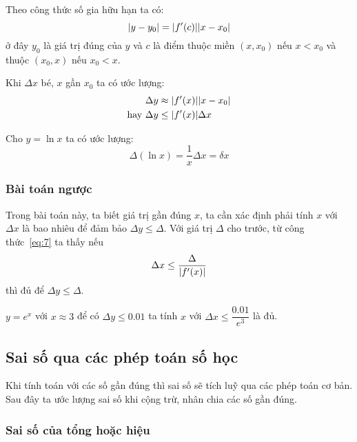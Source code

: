 \documentclass[../../Lectures.tex]{subfiles}
\begin{document}
Theo công thức số gia hữu hạn ta có:
\[\lvert y - y_0\rvert = \lvert f'(c)\rvert\lvert x - x_0\rvert\]
ở đây \(y_0\) là giá trị đúng của \(y\) và \(c\) là điểm thuộc miền \((x, x_0)\)
nếu \(x < x_0\) và thuộc \((x_0, x)\) nếu \(x_0 < x\).

Khi \(\Delta x\) bé, \(x\) gần \(x_0\) ta có ước lượng:
\begin{equation} \label{eq:7}
    \begin{aligned}
                    &\Delta y \approx \lvert f'(x)\rvert\lvert x - x_0\rvert \\
        \text{hay } &\Delta y \leq \lvert f'(x)\rvert\Delta x
    \end{aligned}
\end{equation}

\begin{exmp}
    Cho \(y = \ln{x}\) ta có ước lượng:
    \[\Delta(\ln{x}) = \frac{1}{x} \Delta x = \delta x\]
\end{exmp}

\subsubsection{Bài toán ngược}

Trong bài toán này, ta biết giá trị gần đúng \(x\), ta cần xác định phải tính
\(x\) với \(\Delta x\) là bao nhiêu để đảm bảo \(\Delta y \leq \Delta\). Với giá
trị \(\Delta\) cho trước, từ công thức~\ref{eq:7} ta thấy nếu
\begin{equation} \label{eq:approx_of_relative_error}
    \Delta x \leq \frac{\Delta}{\lvert f'(x)\rvert}
\end{equation}
thì đủ để \(\Delta y \leq \Delta\).

\begin{exmp}
    \(y = e^x\) với \(x \approx 3\) để có \(\Delta y \leq \num{0.01}\) ta tính
    \(x\) với \(\Delta x \leq \dfrac{\num{0.01}}{e^3}\) là đủ.
\end{exmp}

\subsection{Sai số qua các phép toán số học}

Khi tính toán với các số gần đúng thì sai số sẽ tích luỹ qua các phép toán cơ
bản. Sau đây ta ước lượng sai số khi cộng trừ, nhân chia các số gần đúng.

\subsubsection{Sai số của tổng hoặc hiệu}
\end{document}
